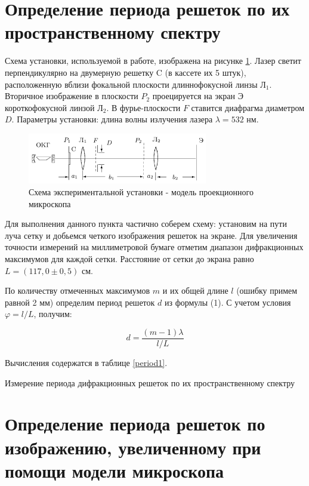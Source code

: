 \documentclass[12pt]{kiarticle}
\begin{document}
	
	\section{Определение периода решеток по их пространственному спектру}
	
	Схема установки, используемой в работе, изображена на рисунке \ref{shema}. Лазер светит перпендикулярно на двумерную решетку C (в кассете их 5 штук), расположенную вблизи фокальной плоскости длиннофокусной линзы $\text{Л}_1$. Вторичное изображение в плоскости $P_2$ проецируется на экран Э короткофокусной линзой $\text{Л}_2$. В фурье-плоскости $F$ ставится диафрагма диаметром $D$. Параметры установки: длина волны излучения лазера $\lambda = 532$ нм.
	
	\begin{figure}[h]
		\centering	
		\includegraphics[width=0.7\textwidth]{shema.png}
		\caption{Схема экспериментальной установки - модель проекционного микроскопа}
		\label{shema}
	\end{figure}
	
	Для выполнения данного пункта частично соберем схему: установим на пути луча сетку и добьемся четкого изображения решеток на экране. Для увеличения точности измерений на миллиметровой бумаге отметим диапазон дифракционных максимумов для каждой сетки. Расстояние от сетки до экрана равно $L = (117,0 \pm 0,5)$ см. 
	
	По количеству отмеченных максимумов $m$ и их общей длине $l$ (ошибку примем равной 2 мм) определим период решеток $d$ из формулы (1). С учетом условия $\varphi = l/L$, получим:
	
	\[ d = \frac{(m-1)\lambda}{l/L} \]
	
	Вычисления содержатся в таблице \ref{period1}.
	
	\begin{table}[h]
		\centering
		
		\caption{Измерение периода дифракционных решеток по их пространственному спектру}
		\label{period1}
	\end{table}	
	
	\section{Определение периода решеток по изображению, увеличенному при помощи модели микроскопа}
	
\end{document}
